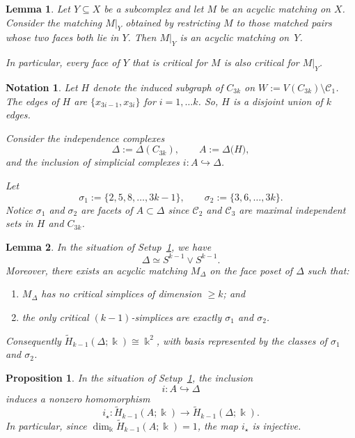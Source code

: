 \documentclass[10pt,a4paper]{amsart}
\newtheorem{lem}{Lemma}
\newtheorem{notation}{Notation}
\newtheorem{prop}{Proposition}
\begin{document}
\begin{lem}
\label{lem:restriction-matching}
Let $Y\subseteq X$ be a subcomplex and let $M$ be an acyclic matching on $X$. Consider the matching
$M|_Y$ obtained by restricting $M$ to those matched pairs whose two faces both lie in $Y$. Then
$M|_Y$ is an acyclic matching on~$Y$.

In particular, every face of $Y$ that is critical for $M$ is also critical for $M|_Y$.
\end{lem}

\begin{notation}
\label{setup:cycle}
Let $H$ denote the induced subgraph of $C_{3k}$ on $W := V(C_{3k})\setminus \mathcal{C}_1$. The edges of $H$ are $\{x_{3i-1},x_{3i}\}$ for $i=1,\ldots k$. So, $H$ is a disjoint union of $k$ edges.


Consider the independence complexes
\[
  \Delta := \Delta(C_{3k}), \qquad A := \Delta\big(H\big),
\]
and the inclusion of simplicial complexes $i\colon A\hookrightarrow \Delta$.

Let
\[
  \sigma_1 :=  \{2,5,8,\dots,3k-1\},\qquad
  \sigma_2 :=  \{3,6,\dots,3k\}.
\]
Notice  $\sigma_1$ and $\sigma_2$ are facets of $A\subset \Delta$
 since   $\mathcal{C}_2$ and $\mathcal{C}_3$ are maximal independent sets in $H$ and $C_{3k}$.  
 \end{notation}

\begin{lem}
\label{lem:Delta-critcells}
In the situation of Setup~\ref{setup:cycle}, we have
\[\Delta  \simeq S^{k-1} \vee S^{k-1}.\]
Moreover, there exists an acyclic matching $M_\Delta$ on the face poset of $\Delta$ such that:
\begin{enumerate}
  \item $M_\Delta$ has no critical simplices of dimension $\ge k$; and
  \item the only critical $(k-1)$-simplices are exactly $\sigma_1$ and $\sigma_2$.
\end{enumerate}
Consequently $\widetilde H_{k-1}(\Delta;\Bbbk)\cong \Bbbk^2$, with basis represented by the classes of $\sigma_1$ and $\sigma_2$.
\end{lem}

\begin{prop}
\label{prop:inclusion-nonzero}
In the situation of Setup~\ref{setup:cycle}, the inclusion
\[
  i\colon A\hookrightarrow\Delta
\]
induces a nonzero homomorphism
\[
  i_{\star}: \widetilde H_{k-1}(A;\Bbbk) \longrightarrow \widetilde H_{k-1}(\Delta;\Bbbk).
\]
In particular, since $\dim_\Bbbk \widetilde H_{k-1}(A;\Bbbk)=1$, the map $i_{\star}$ is injective.
\end{prop}
\end{document}
